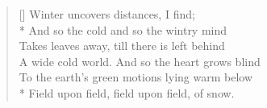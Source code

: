 \documentclass[MAIN]{subfiles}
\begin{document}
\settowidth{\versewidth}{A wide cold world. And so the heart grows blind}
\begin{verse}[\versewidth]
Winter uncovers distances, I find;\\*
And so the cold and so the wintry mind\\
Takes leaves away, till there is left behind\\
A wide cold world. And so the heart grows blind\\
To the earth's green motions lying warm below\\*
Field upon field, field upon field, of snow.
\end{verse}
\end{document}
